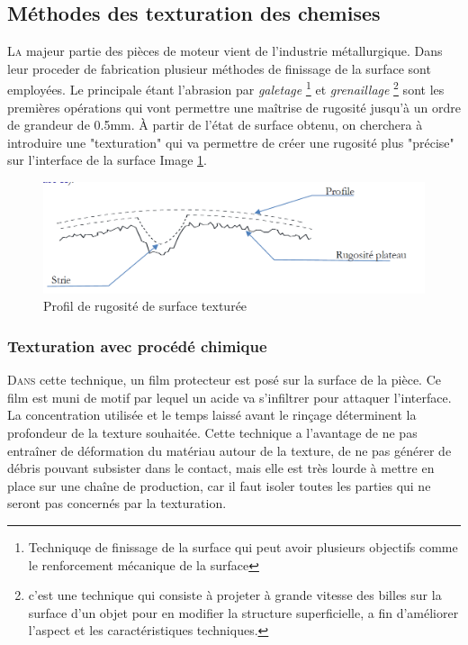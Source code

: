 \subsection{Méthodes des texturation des chemises}
\lettrine{L}{a} majeur partie des pièces de moteur vient de l'industrie métallurgique. Dans leur proceder de fabrication plusieur méthodes de finissage de la surface sont employées. Le principale étant l'abrasion par \emph{galetage} \footnote{Techniquqe de finissage  de la surface qui peut avoir plusieurs objectifs comme le renforcement mécanique de la surface} et \emph{ grenaillage} \footnote{c'est une technique qui consiste à projeter à grande vitesse des billes sur la surface d'un objet pour en modifier la structure superficielle, a fin d'améliorer l'aspect et les caractéristiques techniques.} sont les premières opérations qui vont permettre une maîtrise de rugosité jusqu’à un ordre de grandeur de 0.5mm.\cite{ayad1} À partir de l’état de surface obtenu, on cherchera à introduire une "texturation" qui va permettre de créer une rugosité plus "précise" sur l’interface de la surface Image \ref{fig:caracterisation}.
\begin{figure}[h]
	\centering
	\includegraphics[width=0.7\linewidth]{Img/caracterisation}
	\caption[surface texturée]{Profil de rugosité de surface texturée}
	\label{fig:caracterisation}
\end{figure}
\subsubsection{Texturation avec procédé chimique}
\lettrine{D}{ans} cette technique, un film protecteur est posé sur la surface de la pièce. Ce film est muni de motif par lequel un acide va s’infiltrer pour attaquer l’interface. La concentration utilisée et le temps laissé avant le rinçage déterminent la profondeur de la texture souhaitée. Cette technique a l’avantage de ne pas entraîner de déformation du matériau autour de la texture, de ne pas générer de débris pouvant subsister dans le contact, mais elle est très lourde à mettre en place sur une chaîne de production, car il faut isoler toutes les parties qui ne seront pas concernés par la texturation.
